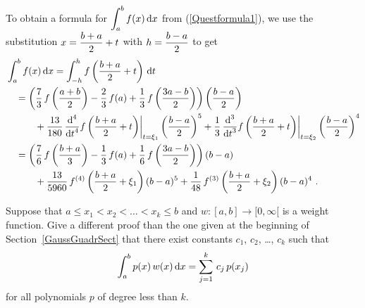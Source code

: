 { To obtain a formula for $\DS \int_a^b f(x)\dx{x}$ from
(\ref{Questformula1}), we use the substitution
$\DS x= \frac{b+a}{2} + t$ with $\DS h = \frac{b-a}{2}$
to get
\begin{align*}
&\int_a^b f(x)\dx{x} = \int_{-h}^h
f\left(\frac{b+a}{2} + t\right) \dx{t} \\
&\quad = \left(\frac{7}{3}\,f\left(\frac{a+b}{2}\right)
- \frac{2}{3}\,f(a)
+ \frac{1}{3}\,f\left(\frac{3a-b}{2}\right)\right)
\left(\frac{b-a}{2}\right) \\
&\quad\qquad + \frac{13}{180}\,
\dfdxn{f\left(\frac{b+a}{2}+t\right)}{t}{4}\bigg|_{t=\xi_1}
\left(\frac{b-a}{2}\right)^5 + \frac{1}{3} \,
\dfdxn{f\left(\frac{b+a}{2}+t\right)}{t}{3}\bigg|_{t=\xi_2}
\left(\frac{b-a}{2}\right)^4 \\  
&\quad= \left(\frac{7}{6}\,f\left(\frac{b+a}{3}\right)
- \frac{1}{3}\,f(a) + \frac{1}{6}\,f\left(\frac{3a-b}{2}\right)\right)
(b-a) \\
&\quad\qquad + \frac{13}{5960}\,
f^{(4)}\left(\frac{b+a}{2}+\xi_1\right) (b-a)^5 + \frac{1}{48} \,
f^{(3)}\left(\frac{b+a}{2}+\xi_2\right) (b-a)^4 \ .
\end{align*}
}

\begin{question}
Suppose that $a \leq x_1 < x_2 < \ldots < x_k \leq b$ and
$w:[a,b]\to [0,\infty[$ is a weight function.   Give a different proof
than the one given at the beginning of Section~\ref{GaussGuadrSect} 
that there exist constants $c_1$, $c_2$, \ldots, $c_k$ such that
\begin{equation}\label{G_quadr}
\int_a^b p(x)\,w(x)\dx{x} = \sum_{j=1}^k\,c_j\,p(x_j)
\end{equation}
for all polynomials $p$ of degree less than $k$.
\end{question}

